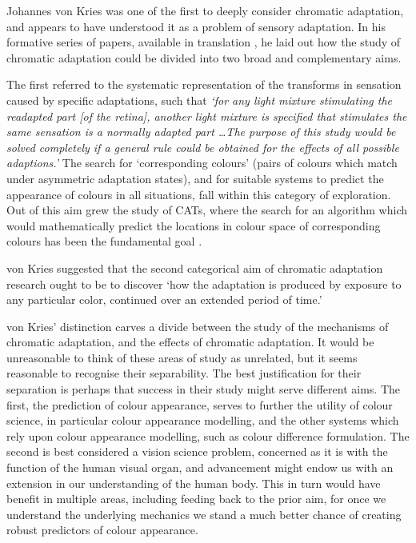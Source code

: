 Johannes von Kries was one of the first to deeply consider chromatic adaptation, and appears to have understood it as a problem of sensory adaptation. In his formative series of papers, available in translation \citep{von_kries_beitrag_1970}, he laid out how the study of chromatic adaptation could be divided into two broad and complementary aims. 

The first referred to the systematic representation of the transforms in sensation caused by specific adaptations, such that \textit{`for any light mixture stimulating the readapted part [of the retina], another light mixture is specified that stimulates the same sensation is a normally adapted part \dots The purpose of this study would be solved completely if a general rule could be obtained for the effects of all possible adaptions.'} The search for `corresponding colours' (pairs of colours which match under asymmetric adaptation states), and for suitable systems to predict the appearance of colours in all situations, fall within this category of exploration. Out of this aim grew the study of \glspl{CAT}, where the search for an algorithm which would mathematically predict the locations in colour space of corresponding colours has been the fundamental goal \citep{cie_cie_2004-1}.

von Kries suggested that the second categorical aim of chromatic adaptation research ought to be to discover `how the adaptation is produced by exposure to any particular color, continued over an extended period of time.' 

von Kries' distinction carves a divide between the study of the mechanisms of chromatic adaptation, and the effects of chromatic adaptation. It would be unreasonable to think of these areas of study as unrelated, but it seems reasonable to recognise their separability. The best justification for their separation is perhaps that success in their study might serve different aims. The first, the prediction of colour appearance, serves to further the utility of colour science, in particular colour appearance modelling, and the other systems which rely upon colour appearance modelling, such as colour difference formulation. 
The second is best considered a vision science problem, concerned as it is with the function of the human visual organ, and advancement might endow us with an extension in our understanding of the human body. This in turn would have benefit in multiple areas, including feeding back to the prior aim, for once we understand the underlying mechanics we stand a much better chance of creating robust predictors of colour appearance. 

